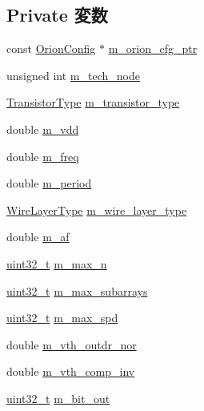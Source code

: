 \subsection*{Private 変数}
\begin{DoxyCompactItemize}
\item 
const \hyperlink{classOrionConfig}{OrionConfig} $\ast$ \hyperlink{classTechParameter_a84de60ae1f7ca812df5347e27a658c77}{m\_\-orion\_\-cfg\_\-ptr}
\item 
unsigned int \hyperlink{classTechParameter_afd2f8e11c3993d6212050f2e58af7161}{m\_\-tech\_\-node}
\item 
\hyperlink{classTechParameter_a397518f993183c7cff9301ba5fa9963a}{TransistorType} \hyperlink{classTechParameter_a15c7c3d21768278b5ff09f1d09745dc3}{m\_\-transistor\_\-type}
\item 
double \hyperlink{classTechParameter_a395319e7289aba689448d4b386516c6b}{m\_\-vdd}
\item 
double \hyperlink{classTechParameter_af53427b02c858776a02ddc4e4255745d}{m\_\-freq}
\item 
double \hyperlink{classTechParameter_ae4ea56fdb017a0bf20b9a27e5958482e}{m\_\-period}
\item 
\hyperlink{classTechParameter_ad43b2d048e1485eadc8c3f0469349c1a}{WireLayerType} \hyperlink{classTechParameter_a1ba98b620ef5a88c97f59aae336c88d9}{m\_\-wire\_\-layer\_\-type}
\item 
double \hyperlink{classTechParameter_a33c4fa4c023d45df03bbdbeb0e872ecc}{m\_\-af}
\item 
\hyperlink{Type_8hh_a435d1572bf3f880d55459d9805097f62}{uint32\_\-t} \hyperlink{classTechParameter_a2c6958389c2d0d4af6000cf71eae4de8}{m\_\-max\_\-n}
\item 
\hyperlink{Type_8hh_a435d1572bf3f880d55459d9805097f62}{uint32\_\-t} \hyperlink{classTechParameter_a159731611077f190a7c7b094b9014229}{m\_\-max\_\-subarrays}
\item 
\hyperlink{Type_8hh_a435d1572bf3f880d55459d9805097f62}{uint32\_\-t} \hyperlink{classTechParameter_aa35b4095233b4be2e2ede5c9602d2de2}{m\_\-max\_\-spd}
\item 
double \hyperlink{classTechParameter_a6ba9d96daad234b060b5c52c984179a1}{m\_\-vth\_\-outdr\_\-nor}
\item 
double \hyperlink{classTechParameter_aea04bea4c337659a5dc5aa2a27a54d42}{m\_\-vth\_\-comp\_\-inv}
\item 
\hyperlink{Type_8hh_a435d1572bf3f880d55459d9805097f62}{uint32\_\-t} \hyperlink{classTechParameter_ab6a960ac7d2761e0d7518e9c08a525b5}{m\_\-bit\_\-out}

\end{DoxyCompactItemize}
